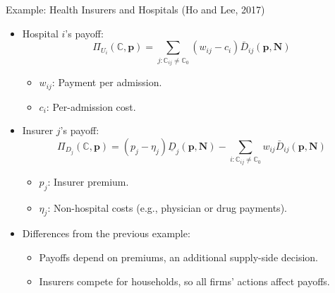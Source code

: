 \documentclass[aspectratio=169]{beamer}  %
\begin{document}
\begin{frame}{Example: Health Insurers and Hospitals (Ho and Lee, 2017)}
    \begin{itemize}
        \item Hospital \(i\)'s payoff:
        \[
        \Pi_{U_i}(\mathbb{C}, \boldsymbol{p}) = \sum_{j : \mathbb{C}_{ij} \neq \mathbb{C}_0} \left(w_{ij} - c_i\right) \bar{D}_{ij}(\boldsymbol{p}, \boldsymbol{N})
        \]
        \begin{itemize}
            \item \(w_{ij}\): Payment per admission.
            \item \(c_i\): Per-admission cost.
        \end{itemize}
        
        \item Insurer \(j\)'s payoff:
        \[
        \Pi_{D_j}(\mathbb{C}, \boldsymbol{p}) = \left(p_j - \eta_j\right) \underline{D}_j(\boldsymbol{p}, \boldsymbol{N}) - \sum_{i : \mathbb{C}_{ij} \neq \mathbb{C}_0} w_{ij} \bar{D}_{ij}(\boldsymbol{p}, \boldsymbol{N})
        \]
        \begin{itemize}
            \item \(p_j\): Insurer premium.
            \item \(\eta_j\): Non-hospital costs (e.g., physician or drug payments).
        \end{itemize}
        
        \item Differences from the previous example:
        \begin{itemize}
            \item Payoffs depend on premiums, an additional supply-side decision.
            \item Insurers compete for households, so all firms' actions affect payoffs.
        \end{itemize}
    \end{itemize}
\end{frame}
\end{document}
